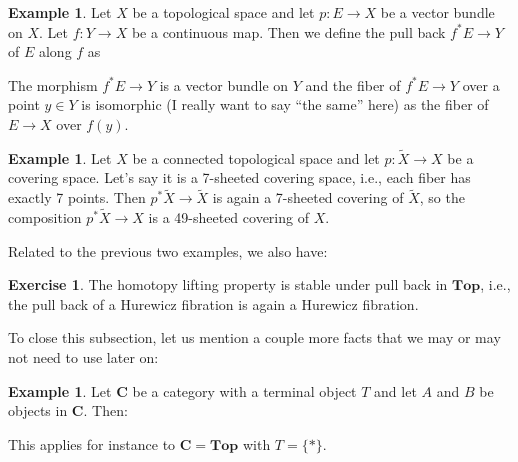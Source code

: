 \documentclass[12pt,a4paper]{amsart}
\theoremstyle{plain}
\theoremstyle{definition}
\newtheorem{exmp}[thm]{Example}
\newtheorem{xca}[thm]{Exercise}
\theoremstyle{remark}
\begin{document}
\begin{exmp}
  Let $X$ be a topological space and let $p \colon E \to X$ be a vector bundle on $X$.
  Let $f \colon Y \to X$ be a continuous map.
  Then we define the pull back $f^{*}E \to Y$ of $E$ along $f$ as
  \begin{center}
  \end{center}
  The morphism $f^{*}E \to Y$ is a vector bundle on $Y$ and the fiber of $f^{*}E \to Y$ over a point $y \in Y$ is isomorphic (I really want to say ``the same'' here) as the fiber of $E \to X$ over $f(y)$.
\end{exmp}

\begin{exmp}
  Let $X$ be a connected topological space and let $p \colon \tilde{X} \to X$ be a covering space.
  Let's say it is a 7-sheeted covering space, i.e., each fiber has exactly 7 points.
  Then $p^{*}\tilde{X} \to \tilde{X}$ is again a 7-sheeted covering of $\tilde{X}$, so the composition $p^{*}\tilde{X} \to X$ is a 49-sheeted covering of $X$.
\end{exmp}

Related to the previous two examples, we also have:

\begin{xca}
  The homotopy lifting property is stable under pull back in $\mathbf{Top}$, i.e., the pull back of a Hurewicz fibration is again a Hurewicz fibration.
\end{xca}

To close this subsection, let us mention a couple more facts that we may or may not need to use later on:

\begin{exmp}
  Let $\mathbf{C}$ be a category with a terminal object $T$ and let $A$ and $B$ be objects in $\mathbf{C}$.
  Then:
  \begin{center}
  \end{center}
  This applies for instance to $\mathbf{C} = \mathbf{Top}$ with $T = \{ * \}$.
\end{exmp}
\end{document}
